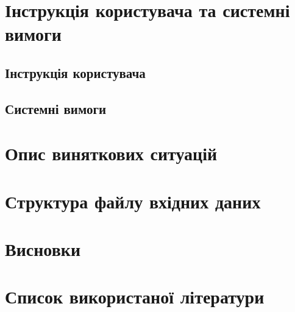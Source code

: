 \documentclass[oneside,14pt]{extarticle}
\begin{document}
\section{Інструкція користувача та системні вимоги}
\subsection{Інструкція користувача}
\subsection{Системні вимоги}
\section{Опис виняткових ситуацій}
\section{Структура файлу вхідних даних}
\section*{Висновки}
\section*{Список використаної літератури}
\end{document}
